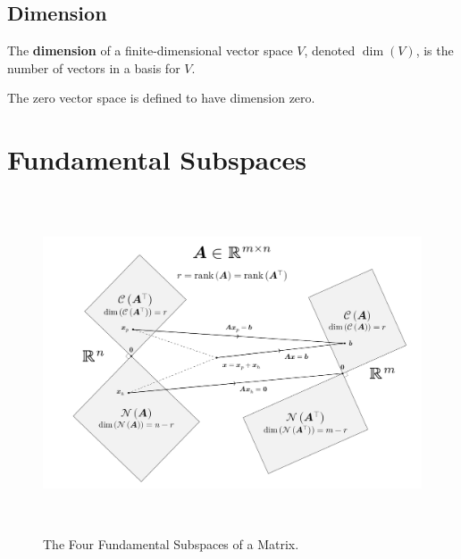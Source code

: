 \documentclass{article}
\begin{document}
\subsection{Dimension}
\begin{definition}
    The \textbf{dimension} of a finite-dimensional vector space \(V\),
    denoted \(\dim{\left( V \right)}\), is the number of vectors in a
    basis for \(V\).
\end{definition}
\begin{theorem}
    The zero vector space is defined to have dimension zero.
\end{theorem}
\newpage
\section{Fundamental Subspaces}
\begin{figure}[H]
    \centering
    \includegraphics[height=10cm, keepaspectratio]{figures/fundamental_subspaces.pdf}
    \caption{The Four Fundamental Subspaces of a Matrix.}
\end{figure}
\end{document}
